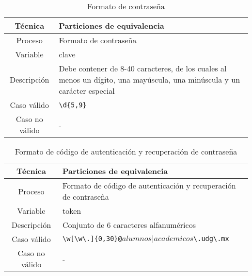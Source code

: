 \begin{table}[h!]
	\centering
	\begin{tabular}{|c|p{10cm}|}
		\hline
		\textbf{Técnica} & \textbf{Particiones de equivalencia}                                                                                    \\
		\hline
		Proceso          & Formato de contraseña                                                                                                   \\
		\hline
		Variable         & clave                                                                                                                   \\
		\hline
		Descripción      & Debe contener de 8-40 caracteres, de los cuales al menos un dígito, una mayúscula, una minúscula y un carácter especial \\
		\hline
		Caso válido      & \texttt{\textbackslash d\{5,9\}}                                                                                        \\
		\hline
		Caso no válido   & -                                                                                                                       \\
		\hline
	\end{tabular}
	\caption{Formato de contraseña}
\end{table}

\begin{table}[h!]
	\centering
	\begin{tabular}{|c|p{10cm}|}
		\hline
		\textbf{Técnica} & \textbf{Particiones de equivalencia}                                                                                            \\
		\hline
		Proceso          & Formato de código de autenticación y recuperación de contraseña                                                                 \\
		\hline
		Variable         & token                                                                                                                           \\
		\hline
		Descripción      & Conjunto de 6 caracteres alfanuméricos                                                                                          \\
		\hline
		Caso válido      & \texttt{\textbackslash w[\textbackslash w\textbackslash .]\{0,30\}@\(alumnos|academicos\)\textbackslash .udg\textbackslash .mx} \\
		\hline
		Caso no válido   & -                                                                                                                               \\
		\hline
	\end{tabular}
	\caption{Formato de código de autenticación y recuperación de contraseña}
\end{table}


